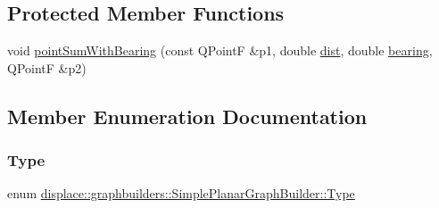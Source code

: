 \subsection*{Protected Member Functions}
\begin{DoxyCompactItemize}
\item 
void \mbox{\hyperlink{classdisplace_1_1graphbuilders_1_1_simple_planar_graph_builder_a2a90e60a8dcb81099af96e1528848e4b}{point\+Sum\+With\+Bearing}} (const Q\+PointF \&p1, double \mbox{\hyperlink{my_rutils_8h_adce57df8ac5e5faa57d86a66535fdd92}{dist}}, double \mbox{\hyperlink{my_rutils_8h_a5859aabd9cf42a292d2b780000079170}{bearing}}, Q\+PointF \&p2)
\end{DoxyCompactItemize}


\subsection{Member Enumeration Documentation}
\mbox{\label{classdisplace_1_1graphbuilders_1_1_simple_planar_graph_builder_aedc525514a7c8f011cb4550c8e4addb7}} 
\subsubsection{\texorpdfstring{Type}{Type}}
{\footnotesize\ttfamily enum \mbox{\hyperlink{classdisplace_1_1graphbuilders_1_1_simple_planar_graph_builder_aedc525514a7c8f011cb4550c8e4addb7}{displace\+::graphbuilders\+::\+Simple\+Planar\+Graph\+Builder\+::\+Type}}}

